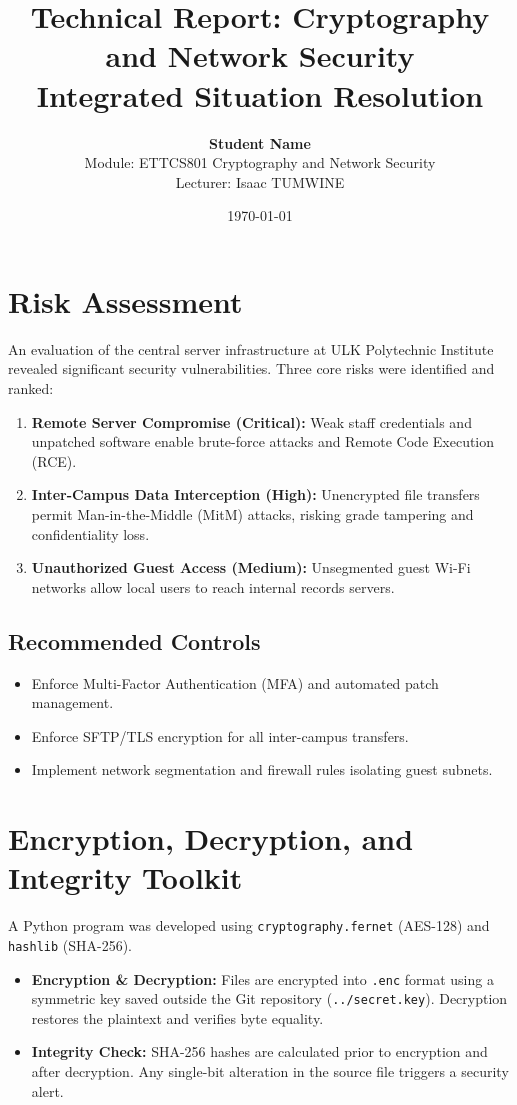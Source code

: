 \documentclass[12pt,a4paper]{article}
\title{\textbf{Technical Report: Cryptography and Network Security}\\ \large Integrated Situation Resolution}
\author{\textbf{Student Name} \\ \small Module: ETTCS801 Cryptography and Network Security \\ \small Lecturer: Isaac TUMWINE}
\date{\today}
\begin{document}
\maketitle

\section{Risk Assessment}
An evaluation of the central server infrastructure at ULK Polytechnic Institute revealed significant security vulnerabilities. Three core risks were identified and ranked:

\begin{enumerate}
    \item \textbf{Remote Server Compromise (Critical):} Weak staff credentials and unpatched software enable brute-force attacks and Remote Code Execution (RCE).
    \item \textbf{Inter-Campus Data Interception (High):} Unencrypted file transfers permit Man-in-the-Middle (MitM) attacks, risking grade tampering and confidentiality loss.
    \item \textbf{Unauthorized Guest Access (Medium):} Unsegmented guest Wi-Fi networks allow local users to reach internal records servers.
\end{enumerate}

\subsection*{Recommended Controls}
\begin{itemize}
    \item Enforce Multi-Factor Authentication (MFA) and automated patch management.
    \item Enforce SFTP/TLS encryption for all inter-campus transfers.
    \item Implement network segmentation and firewall rules isolating guest subnets.
\end{itemize}

\section{Encryption, Decryption, and Integrity Toolkit}
A Python program was developed using \texttt{cryptography.fernet} (AES-128) and \texttt{hashlib} (SHA-256).

\begin{itemize}
    \item \textbf{Encryption \& Decryption:} Files are encrypted into \texttt{.enc} format using a symmetric key saved outside the Git repository (\texttt{../secret.key}). Decryption restores the plaintext and verifies byte equality.
    \item \textbf{Integrity Check:} SHA-256 hashes are calculated prior to encryption and after decryption. Any single-bit alteration in the source file triggers a security alert.
\end{itemize}
\end{document}
